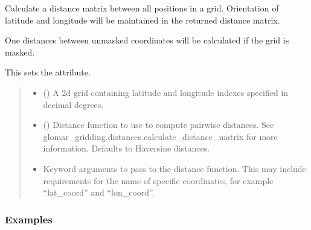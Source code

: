 \documentclass[letterpaper,10pt,english]{sphinxmanual}
\begin{document}
\begin{fulllineitems}
\begin{fulllineitems}
\label{\detokenize{grid:glomar_gridding.grid.Grid.distance_matrix}}
\pysigstartsignatures
\pysiglinewithargsret
{}
{\sphinxparamcomma {}}
{}
\pysigstopsignatures
\sphinxAtStartPar
Calculate a distance matrix between all positions in a grid. Orientation
of latitude and longitude will be maintained in the returned distance
matrix.

\sphinxAtStartPar
One distances between unmasked coordinates will be calculated if the
grid is masked.

\sphinxAtStartPar
This sets the  attribute.
\begin{quote}\begin{description}
\begin{itemize}
\item {}
\sphinxAtStartPar
{} () \textendash{} A 2\sphinxhyphen{}d grid containing latitude and longitude indexes specified in
decimal degrees.

\item {}
\sphinxAtStartPar
{} () \textendash{} Distance function to use to compute pairwise distances. See
glomar\_gridding.distances.calculate\_distance\_matrix for more
information. Defaults to Haversine distances.

\item {}
\sphinxAtStartPar
{} \textendash{} Keyword arguments to pass to the distance function. This may include
requirements for the name of specific coordinates, for example
“lat\_coord” and “lon\_coord”.

\end{itemize}

\sphinxAtStartPar
{}

\end{description}\end{quote}
\subsubsection*{Examples}


\end{fulllineitems}
\end{fulllineitems}
\end{document}
